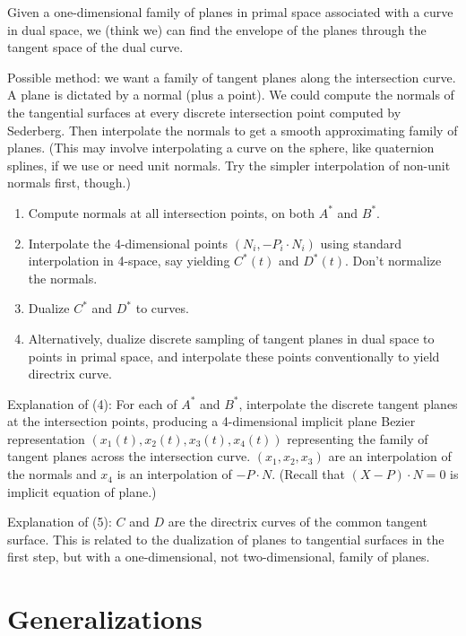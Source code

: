 Given a one-dimensional family of planes in primal space 
associated with a curve in dual space, we (think we) can find the envelope
of the planes through the tangent space of the dual curve.

Possible method: we want a family of tangent planes along the intersection
	curve.  A plane is dictated by a normal (plus a point).
	We could compute the normals of the tangential surfaces at every
	discrete intersection point computed by Sederberg.
	Then interpolate the normals to get a smooth approximating family of planes.
	(This may involve interpolating a curve on the sphere, like quaternion
	splines, if we use or need unit normals.
	Try the simpler interpolation of non-unit normals first, though.)

\begin{enumerate}
\item Compute normals at all intersection points, on both $A^*$ and $B^*$.
\item Interpolate the 4-dimensional points
	$(N_i, -P_i \cdot N_i)$ using standard interpolation in 4-space,
	say yielding $C^*(t)$ and $D^*(t)$.
	Don't normalize the normals.
\item Dualize $C^*$ and $D^*$ to curves.
\item Alternatively, dualize discrete sampling of tangent planes in dual space
	to points in primal space, and interpolate these points conventionally
	to yield directrix curve.
\end{enumerate}
Explanation of (4):
	For each of $A^*$ and $B^*$,
	interpolate the discrete tangent planes at the intersection points,
	producing a 4-dimensional implicit plane Bezier representation
	$(x_1(t), x_2(t), x_3(t), x_4(t))$ representing the family
	of tangent planes across the intersection curve.
	$(x_1,x_2,x_3)$ are an interpolation of the normals
	and $x_4$ is an interpolation of $-P \cdot N$.
	(Recall that $(X - P) \cdot N = 0$ is implicit equation of plane.)

Explanation of (5):
	$C$ and $D$ are the directrix curves of the common tangent surface.
	This is related to the dualization of planes to tangential surfaces
	in the first step, but with a one-dimensional,
	not two-dimensional, family of planes.
	
\section{Generalizations}

